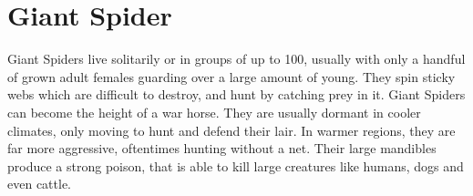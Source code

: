 \section{Giant Spider}

Giant Spiders live solitarily or in groups of up to 100, usually with only a handful of grown adult females guarding over a large amount of young. They spin sticky webs which are difficult to destroy, and hunt by catching prey in it. Giant Spiders can become the height of a war horse. They are usually dormant in cooler climates, only moving to hunt and defend their lair. In warmer regions, they are far more aggressive, oftentimes hunting without a net. Their large mandibles produce a strong poison, that is able to kill large creatures like humans, dogs and even cattle.